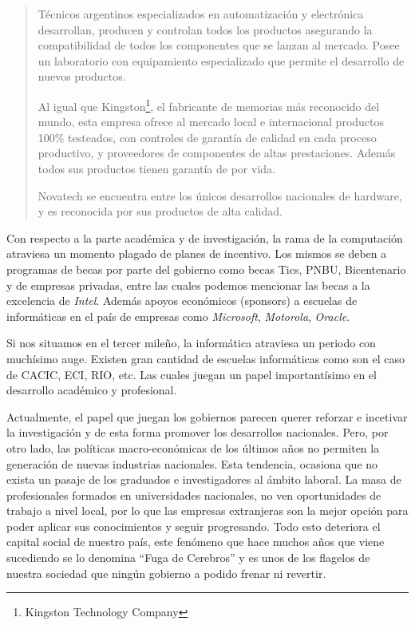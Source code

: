 \documentclass[%
  	final,
%
	notitlepage,
	narroweqnarray,
	inline,
 	twoside,
	]{ieee}
\begin{document}
\begin{quote}
T\'ecnicos argentinos especializados en automatizaci\'on y electr\'onica desarrollan, producen y controlan todos los productos asegurando la compatibilidad de todos los componentes que se lanzan al mercado. Posee un laboratorio con equipamiento especializado que permite el desarrollo de nuevos productos.

Al igual que Kingston\footnote{Kingston Technology Company\cite{kingston}}, el fabricante de memorias m\'as reconocido del mundo, esta empresa ofrece al mercado local e internacional productos 100\% testeados, con controles de garant\'ia de calidad en cada proceso productivo, y proveedores de componentes de altas prestaciones. Adem\'as todos sus productos tienen garant\'ia de por vida.

Novatech se encuentra entre los \'unicos desarrollos nacionales de hardware, y es reconocida por sus productos de alta calidad.\\

\end{quote}
Con respecto a la parte acad\'emica y de investigaci\'on, la rama de la computaci\'on atraviesa un momento plagado de planes de incentivo. Los mismos se deben a programas de becas por parte del gobierno como becas Tics\cite{becas}, PNBU, Bicentenario y de empresas privadas, entre las cuales podemos mencionar las becas a la excelencia de \textit{Intel}. Adem\'as apoyos econ\'omicos (sponsors) a escuelas de inform\'aticas en el pa\'is de empresas como \textit{Microsoft}, \textit{Motorola}, \textit{Oracle}.

Si nos situamos en el tercer mile\~no, la inform\'atica atraviesa un periodo con much\'isimo auge. Existen gran cantidad de escuelas inform\'aticas como son el caso de CACIC, ECI, RIO, etc. Las cuales juegan un papel important\'isimo en el desarrollo acad\'emico y profesional.

Actualmente, el papel que juegan los gobiernos parecen querer reforzar e incetivar la investigaci\'on y de esta forma promover los desarrollos nacionales. Pero, por otro lado, las pol\'iticas macro-econ\'omicas de los \'ultimos a\~nos no permiten la generaci\'on de nuevas industrias nacionales. Esta tendencia, ocasiona que no exista un pasaje de los graduados e investigadores al \'ambito laboral. La masa de profesionales formados en universidades nacionales, no ven oportunidades de trabajo a nivel local, por lo que las empresas extranjeras son la mejor opci\'on para poder aplicar sus conocimientos y seguir progresando. Todo esto deteriora el capital social de nuestro pa\'is, este fen\'omeno que hace muchos a\~nos que viene sucediendo se lo denomina ``Fuga de Cerebros'' y es unos de los flagelos de nuestra sociedad que ning\'un gobierno a podido frenar ni revertir.
\end{document}
